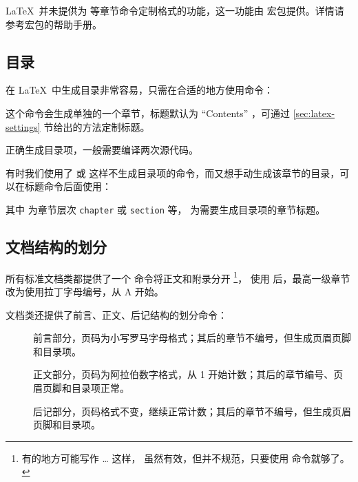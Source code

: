 \LaTeX\ 并未提供为  等章节命令定制格式的功能，这一功能由  宏包提供。详情请参考宏包的帮助手册。

\subsection{目录}\label{sec:toc}

在 \LaTeX\ 中生成目录非常容易，只需在合适的地方使用命令：
\begin{command}
\end{command}

这个命令会生成单独的一个章节，标题默认为 ``Contents'' ，可通过 \ref{sec:latex-settings} 节给出的方法定制标题。

正确生成目录项，一般需要编译两次源代码。

有时我们使用了  或  这样不生成目录项的命令，而又想手动生成该章节的目录，可以在标题命令后面使用：
\begin{command}
\end{command}

其中  为章节层次 \texttt{chapter} 或 \texttt{section} 等， 为需要生成目录项的章节标题。

\subsection{文档结构的划分}\label{sec:matters}

所有标准文档类都提供了一个  命令将正文和附录分开%
\footnote{有的地方可能写作   \ldots {}  这样，
虽然有效，但并不规范，只要使用  命令就够了。}，
使用  后，最高一级章节改为使用拉丁字母编号，从 A 开始。

 文档类还提供了前言、正文、后记结构的划分命令：
\begin{description}
  \item[] 前言部分，页码为小写罗马字母格式；其后的章节不编号，但生成页眉页脚和目录项。
  \item[] 正文部分，页码为阿拉伯数字格式，从 1 开始计数；其后的章节编号、页眉页脚和目录项正常。
  \item[] 后记部分，页码格式不变，继续正常计数；其后的章节不编号，但生成页眉页脚和目录项。
\end{description}

